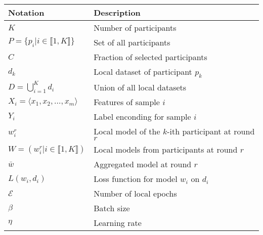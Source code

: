 
\begin{tabular}{ll}
  \toprule %
  \textbf{Notation}                                                   & \textbf{Description} \\
  \midrule %
  $K$                                                                 & Number of participants \\
  $P = \lbrace p_i | i \in \llbracket 1,K \rrbracket \rbrace$         & Set of all participants \\
  $C$                                                                 & Fraction of selected participants \\
  $d_k$                                                               & Local dataset of participant $p_k$ \\
  $D = \bigcup_{i=1}^K d_i$                                           & Union of all local datasets \\
  $X_i = \langle x_1, x_2, \dots, x_m \rangle$                        & Features of sample $i$ \\
  $Y_i$                                                               & Label enconding for sample $i$ \\
  $w_i^r$                                                             & Local model of the $k$-ith participant at round $r$ \\
  $W = (w_i^r | i \in \llbracket 1,K \rrbracket)$                     & Local models from participants at round $r$ \\
  $\bar{w}$                                                           & Aggregated model at round $r$ \\
  $L(w_i, d_i)$                                                       & Loss function for model $w_i$ on $d_i$ \\
  $\mathcal{E}$                                                       & Number of local epochs \\
  $\beta$                                                             & Batch size \\
  $\eta$                                                              & Learning rate \\
  \bottomrule %
\end{tabular}